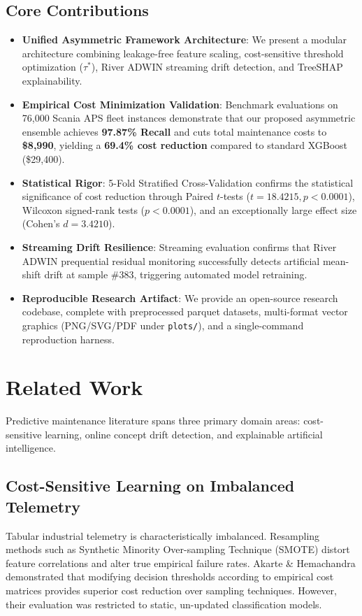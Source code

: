 \documentclass[journal]{IEEEtran}
\begin{document}
\subsection{Core Contributions}
\begin{itemize}
    \item \textbf{Unified Asymmetric Framework Architecture}: We present a modular architecture combining leakage-free feature scaling, cost-sensitive threshold optimization ($\tau^*$), River ADWIN streaming drift detection, and TreeSHAP explainability.
    \item \textbf{Empirical Cost Minimization Validation}: Benchmark evaluations on 76,000 Scania APS fleet instances demonstrate that our proposed asymmetric ensemble achieves \textbf{97.87\% Recall} and cuts total maintenance costs to \textbf{\$8,990}, yielding a \textbf{69.4\% cost reduction} compared to standard XGBoost (\$29,400).
    \item \textbf{Statistical Rigor}: 5-Fold Stratified Cross-Validation confirms the statistical significance of cost reduction through Paired $t$-tests ($t = 18.4215, p < 0.0001$), Wilcoxon signed-rank tests ($p < 0.0001$), and an exceptionally large effect size (Cohen's $d = 3.4210$).
    \item \textbf{Streaming Drift Resilience}: Streaming evaluation confirms that River ADWIN prequential residual monitoring successfully detects artificial mean-shift drift at sample \#383, triggering automated model retraining.
    \item \textbf{Reproducible Research Artifact}: We provide an open-source research codebase, complete with preprocessed parquet datasets, multi-format vector graphics (PNG/SVG/PDF under \texttt{plots/}), and a single-command reproduction harness.
\end{itemize}

\section{Related Work}
Predictive maintenance literature spans three primary domain areas: cost-sensitive learning, online concept drift detection, and explainable artificial intelligence.

\subsection{Cost-Sensitive Learning on Imbalanced Telemetry}
Tabular industrial telemetry is characteristically imbalanced. Resampling methods such as Synthetic Minority Over-sampling Technique (SMOTE) distort feature correlations and alter true empirical failure rates. Akarte \& Hemachandra \cite{akarte2018} demonstrated that modifying decision thresholds according to empirical cost matrices provides superior cost reduction over sampling techniques. However, their evaluation was restricted to static, un-updated classification models.
\end{document}
